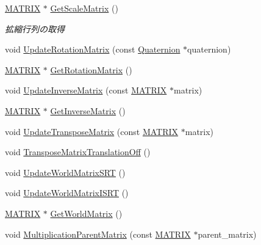 \begin{DoxyCompactItemize}
\mbox{\hyperlink{_vector3_d_8h_a032295cd9fb1b711757c90667278e744}{M\+A\+T\+R\+IX}} $\ast$ \mbox{\hyperlink{class_matrix_extend_a13d6cb82385873959bde75fb64235943}{Get\+Scale\+Matrix}} ()
\begin{DoxyCompactList}\small\item\em 拡縮行列の取得 \end{DoxyCompactList}\item 
void \mbox{\hyperlink{class_matrix_extend_afa307701c3147fc345ed10dee054affb}{Update\+Rotation\+Matrix}} (const \mbox{\hyperlink{_vector3_d_8h_a3ee38c9c46d9851e33a9a1113328dafc}{Quaternion}} $\ast$quaternion)
\item 
\mbox{\hyperlink{_vector3_d_8h_a032295cd9fb1b711757c90667278e744}{M\+A\+T\+R\+IX}} $\ast$ \mbox{\hyperlink{class_matrix_extend_a6e10c2692b92f15ea4a1a69fc22c66c4}{Get\+Rotation\+Matrix}} ()
\item 
void \mbox{\hyperlink{class_matrix_extend_a5aa7bce55ed92acb79d21fda51e83146}{Update\+Inverse\+Matrix}} (const \mbox{\hyperlink{_vector3_d_8h_a032295cd9fb1b711757c90667278e744}{M\+A\+T\+R\+IX}} $\ast$matrix)
\item 
\mbox{\hyperlink{_vector3_d_8h_a032295cd9fb1b711757c90667278e744}{M\+A\+T\+R\+IX}} $\ast$ \mbox{\hyperlink{class_matrix_extend_aedfee5eb2eb7df8cac4b17045233748a}{Get\+Inverse\+Matrix}} ()
\item 
void \mbox{\hyperlink{class_matrix_extend_a81e92fe4305ff9569809b61e2e92df31}{Update\+Transpose\+Matrix}} (const \mbox{\hyperlink{_vector3_d_8h_a032295cd9fb1b711757c90667278e744}{M\+A\+T\+R\+IX}} $\ast$matrix)
\item 
void \mbox{\hyperlink{class_matrix_extend_ae567bb2d140dff892ed1b63f8de33ba9}{Transpose\+Matrix\+Translation\+Off}} ()
\item 
void \mbox{\hyperlink{class_matrix_extend_a4c92a6d037b00bc2514064e00323c5dd}{Update\+World\+Matrix\+S\+RT}} ()
\item 
void \mbox{\hyperlink{class_matrix_extend_ab0aaf14f8621fde91f9db5537a4187e6}{Update\+World\+Matrix\+I\+S\+RT}} ()
\item 
\mbox{\hyperlink{_vector3_d_8h_a032295cd9fb1b711757c90667278e744}{M\+A\+T\+R\+IX}} $\ast$ \mbox{\hyperlink{class_matrix_extend_a1a88845d1b9da14c33c91fa8da2e3a15}{Get\+World\+Matrix}} ()
\item 
void \mbox{\hyperlink{class_matrix_extend_a1847728feb977bd7ccdf1987953fe203}{Multiplication\+Parent\+Matrix}} (const \mbox{\hyperlink{_vector3_d_8h_a032295cd9fb1b711757c90667278e744}{M\+A\+T\+R\+IX}} $\ast$parent\+\_\+matrix)
\end{DoxyCompactItemize}
